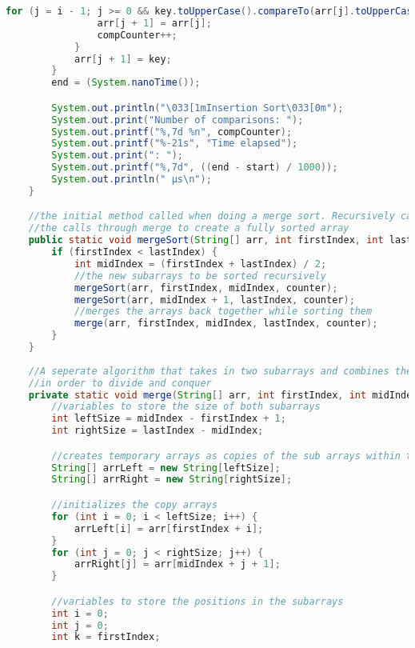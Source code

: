 \documentclass[letterpaper, 10pt,DIV=13]{scrartcl}
\numberwithin{equation}{section} %
\numberwithin{figure}{section} %
\numberwithin{table}{section} %
\begin{document}
\begin{lstlisting}[frame=single, breaklines, language=java]
            for (j = i - 1; j >= 0 && key.toUpperCase().compareTo(arr[j].toUpperCase()) < 0; j--) {
                arr[j + 1] = arr[j];
                compCounter++;
            }
            arr[j + 1] = key;
        }
        end = (System.nanoTime());

        System.out.println("\033[1mInsertion Sort\033[0m");
        System.out.print("Number of comparisons: ");
        System.out.printf("%,7d %n", compCounter);
        System.out.printf("%-21s", "Time elapsed");
        System.out.print(": ");
        System.out.printf("%,7d", ((end - start) / 1000));
        System.out.println(" µs\n");
    }

    //the initial method called when doing a merge sort. Recursively calls itself until all sub arrays are of size one, and then reverses
    //the calls through merge to create a fully sorted array
    public static void mergeSort(String[] arr, int firstIndex, int lastIndex, int[] counter) {
        if (firstIndex < lastIndex) {
            int midIndex = (firstIndex + lastIndex) / 2;
            //the new subarrays to be sorted recursively
            mergeSort(arr, firstIndex, midIndex, counter);
            mergeSort(arr, midIndex + 1, lastIndex, counter);
            //merges the arrays back together while sorting them
            merge(arr, firstIndex, midIndex, lastIndex, counter);
        }
    }
    
    //A seperate algorithm that takes in two subarrays and combines them while sorting them. This method is used recursively in mergeSort()
    //in order to divide and conquer
    private static void merge(String[] arr, int firstIndex, int midIndex, int lastIndex, int[] counter) {
        //variables to store the size of both subarrays
        int leftSize = midIndex - firstIndex + 1;
        int rightSize = lastIndex - midIndex;

        //creates temporary arrays as copies of the sub arrays within the passed array
        String[] arrLeft = new String[leftSize];
        String[] arrRight = new String[rightSize];

        //initializes the copy arrays
        for (int i = 0; i < leftSize; i++) {
            arrLeft[i] = arr[firstIndex + i];
        }
        for (int j = 0; j < rightSize; j++) {
            arrRight[j] = arr[midIndex + j + 1];
        }

        //variables to store the positions in the subarrays
        int i = 0;
        int j = 0;
        int k = firstIndex;


\end{lstlisting}
\end{document}
